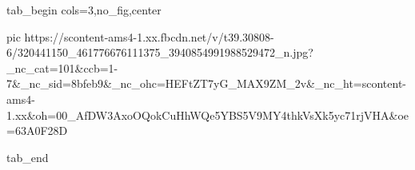  
 
 
 
 


\ifcmt
  tab_begin cols=3,no_fig,center

     pic https://scontent-ams4-1.xx.fbcdn.net/v/t39.30808-6/320441150_461776676111375_3940854991988529472_n.jpg?_nc_cat=101&ccb=1-7&_nc_sid=8bfeb9&_nc_ohc=HEFtZT7yG_MAX9ZM_2v&_nc_ht=scontent-ams4-1.xx&oh=00_AfDW3AxoOQokCuHhWQe5YBS5V9MY4thkVsXk5yc71rjVHA&oe=63A0F28D

  tab_end
\fi
